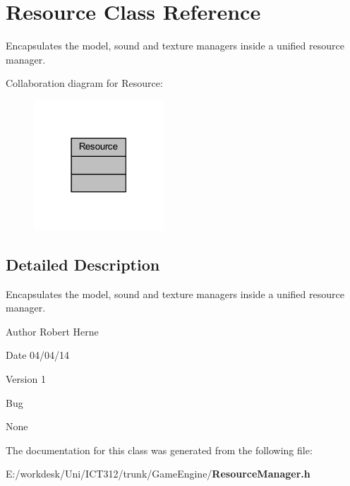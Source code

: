 \section{Resource Class Reference}
\label{class_resource}


Encapsulates the model, sound and texture managers inside a unified resource manager.  




Collaboration diagram for Resource\+:\nopagebreak
\begin{figure}[H]
\begin{center}
\leavevmode
\includegraphics[width=138pt]{d2/d9e/class_resource__coll__graph}
\end{center}
\end{figure}


\subsection{Detailed Description}
Encapsulates the model, sound and texture managers inside a unified resource manager. 

\begin{DoxyAuthor}{Author}
Robert Herne 
\end{DoxyAuthor}
\begin{DoxyDate}{Date}
04/04/14 
\end{DoxyDate}
\begin{DoxyVersion}{Version}
1
\end{DoxyVersion}
\begin{DoxyRefDesc}{Bug}
\item[{\bf Bug}]None \end{DoxyRefDesc}


The documentation for this class was generated from the following file\+:\begin{DoxyCompactItemize}
\item 
E\+:/workdesk/\+Uni/\+I\+C\+T312/trunk/\+Game\+Engine/{\bf Resource\+Manager.\+h}\end{DoxyCompactItemize}
